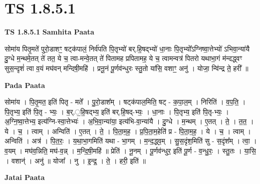 \documentclass[17pt]{extarticle}
\begin{document}
\section*{ TS 1.8.5.1 }

\textbf{TS 1.8.5.1 } \newline
\textbf{Samhita Paata} \newline

सोमा॑य पितृ॒मते॑ पुरो॒डाशꣳ॒॒ षट्क॑पालं॒ निर्व॑पति पि॒तृभ्यो॑ बर्.हि॒षद्भ्यो॑ धा॒नाः पि॒तृभ्यो᳚ऽग्निष्वा॒त्तेभ्यो॑ ऽभिवा॒न्या॑यै दु॒ग्धे म॒न्थमे॒तत् ते॑ तत॒ ये च॒ त्वा-मन्वे॒तत् ते॑ पितामह प्रपितामह॒ ये च॒ त्वामन्वत्र॑ पितरो यथाभा॒गं म॑न्दद्ध्वꣳ सुस॒न्दृशं॑ त्वा व॒यं मघ॑वन् मन्दिषी॒महि॑ । प्रनू॒नं पू॒र्णव॑न्धुरः स्तु॒तो या॑सि॒ वशाꣳ॒॒ अनु॑ । योजा॒ न्वि॑न्द्र ते॒ हरी᳚ ॥ \newline

\textbf{Pada Paata} \newline

सोमा॑य । पि॒तृ॒मत॒ इति॑ पितृ - मते᳚ । पु॒रो॒डाश᳚म् । षट्क॑पाल॒मिति॒ षट् - क॒पा॒ल॒म् । निरिति॑ । व॒प॒ति॒ । पि॒तृभ्य॒ इति॑ पि॒तृ - भ्यः॒ । ब॒र्.॒हि॒षद्भ्य॒ इति॑ बर्.हि॒षद्-भ्यः॒ । धा॒नाः । पि॒तृभ्य॒ इति॑ पि॒तृ-भ्यः॒ । अ॒ग्नि॒ष्वा॒त्तेभ्य॒ इत्य॑ग्नि-स्वा॒त्तेभ्यः॑ । अ॒भि॒वा॒न्या॑या॒ इत्य॑भि-वा॒न्या॑यै । दु॒ग्धे । म॒न्थम् । ए॒तत् । ते॒ । त॒त॒ । ये । च॒ । त्वाम् । अन्विति॑ । ए॒तत् । ते॒ । पि॒ता॒म॒ह॒ । प्र॒पि॒ता॒म॒हेति॑ प्र - पि॒ता॒म॒ह॒ । ये । च॒ । त्वाम् । अन्विति॑ । अत्र॑ । पि॒त॒रः॒ । य॒था॒भा॒गमिति॑ यथा - भा॒गम् । म॒न्द॒द्ध्व॒म् । सु॒स॒दृंश॒मिति॑ सु - स॒दृंश᳚म् । त्वा॒ । व॒यम् । मघ॑व॒न्निति॒ मघ॑-व॒न्न् । म॒न्दि॒षी॒महि॑ ॥ प्रेति॑ । नू॒नम् । पू॒र्णव॑न्धुर॒ इति॑ पू॒र्ण - व॒न्धु॒रः॒ । स्तु॒तः । या॒सि॒ । वशान्॑ । अनु॑ ॥ योजा᳚ । नु । इ॒न्द्र॒ । ते॒ । हरी॒ इति॑ ॥  \newline



\textbf{Jatai Paata} \newline
\end{document}
